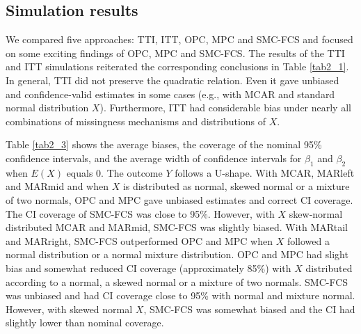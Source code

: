 	\subsection{Simulation results}
	We compared five approaches: TTI, ITT, OPC, MPC and SMC-FCS and focused on some exciting findings of OPC, MPC and SMC-FCS. The results of the TTI and ITT simulations reiterated the corresponding conclusions in Table \ref{tab2_1}. In general, TTI did not preserve the quadratic relation. Even it gave unbiased and confidence-valid estimates in some cases (e.g., with MCAR and standard normal distribution $X$). Furthermore, ITT had considerable bias under nearly all combinations of missingness mechanisms and distributions of $X$. 
	
	Table \ref{tab2_3} shows the average biases, the coverage of the nominal 95\% confidence intervals, and the average width of confidence intervals for $\beta_1$ and $\beta_2$ when $E(X)$ equals 0. The outcome $Y$ follows a U-shape. With MCAR, MARleft and MARmid and when $X$ is distributed as normal, skewed normal or a mixture of two normals, OPC and MPC gave unbiased estimates and correct CI coverage. The CI coverage of SMC-FCS was close to 95\%. However, with $X$ skew-normal distributed MCAR and MARmid, SMC-FCS was slightly biased. With MARtail and MARright, SMC-FCS outperformed OPC and MPC when $X$ followed a normal distribution or a normal mixture distribution. OPC and MPC had slight bias and somewhat reduced CI coverage (approximately 85\%) with $X$ distributed according to a normal, a skewed normal or a mixture of two normals. SMC-FCS was unbiased and had CI coverage close to 95\% with normal and mixture normal. However, with skewed normal $X$, SMC-FCS was somewhat biased and the CI had slightly lower than nominal coverage.
	
